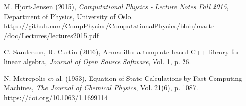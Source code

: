 \documentclass[12pt, a4paper]{article}
\begin{document}
\begin{thebibliography}{40}

 M. Hjort-Jensen (2015), \textit{Computational Physics - Lecture Notes Fall 2015}, 
Department of Physics, University of Oslo. \\ 
\href{https://github.com/CompPhysics/ComputationalPhysics/blob/master/doc/Lectures/lectures2015.pdf}
{https://github.com/CompPhysics/ComputationalPhysics/blob/master\\/doc/Lectures/lectures2015.pdf}

 C. Sanderson, R. Curtin (2016), Armadillo: a template-based C++ library for linear 
algebra, \textit{Journal of Open Source Software}, Vol. 1, p. 26.  

 N. Metropolis et al. (1953), Equation of State Calculations by Fast Computing 
Machines, \textit{The Journal of Chemical Physics}, Vol. 21(6), p. 1087. \\
\href{https://doi.org/10.1063/1.1699114}{https://doi.org/10.1063/1.1699114}
 

\end{thebibliography} 
\end{document}
